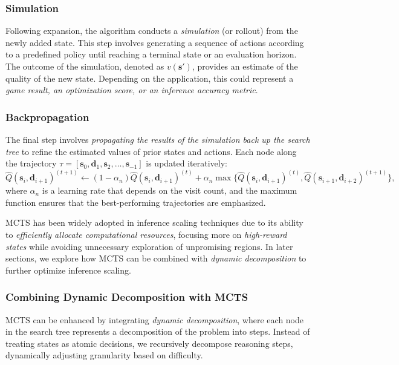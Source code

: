 \subsubsection{Simulation}
Following expansion, the algorithm conducts a \emph{simulation} (or rollout) from the newly added state. This step involves generating a sequence of actions according to a predefined policy until reaching a terminal state or an evaluation horizon. The outcome of the simulation, denoted as $v(\boldsymbol{s}')$, provides an estimate of the quality of the new state. Depending on the application, this could represent a \emph{game result, an optimization score, or an inference accuracy metric}.

\subsubsection{Backpropagation}
The final step involves \emph{propagating the results of the simulation back up the search tree} to refine the estimated values of prior states and actions. Each node along the trajectory $\tau = [\boldsymbol{s}_0, \boldsymbol{d}_1, \boldsymbol{s}_2, \dots, \boldsymbol{s}_{-1}]$ is updated iteratively:
\begin{equation}
    \label{eq:backprop_mcts}
    \hat{Q}(\boldsymbol{s}_i, \boldsymbol{d}_{i+1})^{(t+1)} \leftarrow (1-\alpha_n) \hat{Q}(\boldsymbol{s}_i, \boldsymbol{d}_{i+1})^{(t)} + \alpha_n \max\{\hat{Q}(\boldsymbol{s}_i, \boldsymbol{d}_{i+1})^{(t)}, \hat{Q}(\boldsymbol{s}_{i+1}, \boldsymbol{d}_{i+2})^{(t+1)}\},
\end{equation}
where $\alpha_n$ is a learning rate that depends on the visit count, and the maximum function ensures that the best-performing trajectories are emphasized.

MCTS has been widely adopted in inference scaling techniques due to its ability to \emph{efficiently allocate computational resources}, focusing more on \emph{high-reward states} while avoiding unnecessary exploration of unpromising regions. In later sections, we explore how MCTS can be combined with \emph{dynamic decomposition} to further optimize inference scaling.

\subsubsection{Combining Dynamic Decomposition with MCTS}
MCTS can be enhanced by integrating \emph{dynamic decomposition}, where each node in the search tree represents a decomposition of the problem into steps. Instead of treating states as atomic decisions, we recursively decompose reasoning steps, dynamically adjusting granularity based on difficulty.

